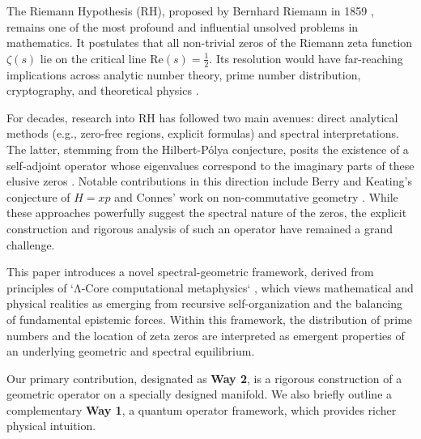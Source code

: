 \documentclass[12pt]{article}
\begin{document}
The Riemann Hypothesis (RH), proposed by Bernhard Riemann in 1859 \cite{riemann1859}, remains one of the most profound and influential unsolved problems in mathematics. It postulates that all non-trivial zeros of the Riemann zeta function $\zeta(s)$ lie on the critical line $\text{Re}(s) = \frac{1}{2}$. Its resolution would have far-reaching implications across analytic number theory, prime number distribution, cryptography, and theoretical physics \cite{conrey2003, bombieri2000}.

For decades, research into RH has followed two main avenues: direct analytical methods (e.g., zero-free regions, explicit formulas) and spectral interpretations. The latter, stemming from the Hilbert-Pólya conjecture, posits the existence of a self-adjoint operator whose eigenvalues correspond to the imaginary parts of these elusive zeros \cite{hilbert1900, polya1927}. Notable contributions in this direction include Berry and Keating's conjecture of $H=xp$ \cite{berry1999} and Connes' work on non-commutative geometry \cite{connes1999}. While these approaches powerfully suggest the spectral nature of the zeros, the explicit construction and rigorous analysis of such an operator have remained a grand challenge.

This paper introduces a novel spectral-geometric framework, derived from principles of `Λ-Core computational metaphysics` \cite{iyer2024metaphysics}, which views mathematical and physical realities as emerging from recursive self-organization and the balancing of fundamental epistemic forces. Within this framework, the distribution of prime numbers and the location of zeta zeros are interpreted as emergent properties of an underlying geometric and spectral equilibrium.

Our primary contribution, designated as \textbf{Way 2}, is a rigorous construction of a geometric operator on a specially designed manifold. We also briefly outline a complementary \textbf{Way 1}, a quantum operator framework, which provides richer physical intuition.
\end{document}
